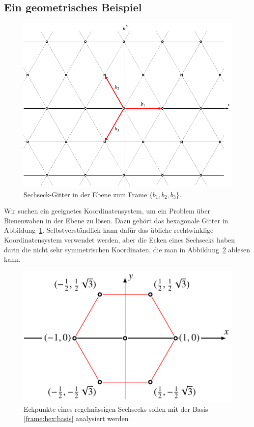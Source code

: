 \subsection{Ein geometrisches Beispiel
\label{subsection:hexagon}}
\begin{figure}
\centering
\includegraphics{chapters/1-geometrie/images/hexagon.pdf}
\caption{Sechseck-Gitter in der Ebene zum Frame $\{b_1,b_2,b_3\}$.
\label{geometrie:hexagon:image}}
\end{figure}
Wir suchen ein geeignetes Koordinatensystem, um ein Problem über
Bienenwaben in der Ebene zu lösen.
Dazu gehört das hexagonale Gitter in Abbildung~\ref{geometrie:hexagon:image}.
%
%
%
Selbstverständlich kann dafür das übliche rechtwinklige Koordinatensystem
verwendet werden, aber die Ecken eines Sechsecks haben darin die nicht
sehr symmetrischen Koordinaten, die man in Abbildung~\ref{frame:hex:sechseck}
ablesen kann.
\begin{figure}
\centering
\includegraphics{chapters/1-geometrie/images/hexagon1.pdf}
\caption{Eckpunkte eines regelmässigen Sechsecks sollen mit der
Basis \eqref{frame:hex:basis} analysiert werden
\label{frame:hex:sechseck}}
\end{figure}
